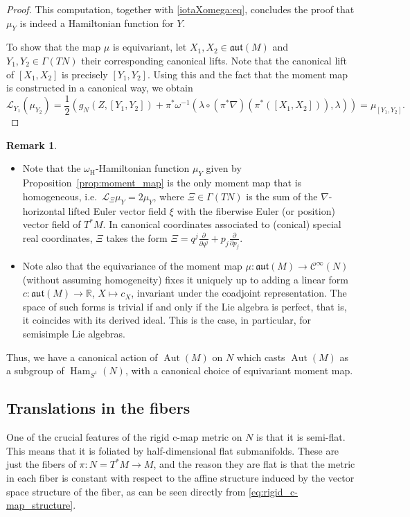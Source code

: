 \documentclass{article}
\theoremstyle{definition}
\newtheorem{remark}[theorem]{Remark}
\DeclareMathOperator{\Aut}{Aut}
\DeclareMathOperator{\Ham}{Ham}
\newcommand{\R}{\mathbb{R}}
\newcommand{\calC}{\mathcal{C}}
\newcommand{\calL}{\mathcal{L}}
\newcommand{\hor}{\mathrm{H}}
\newcommand{\aut}{\mathfrak{aut}}
\newcommand{\pd}[2]{\frac{\partial #1}{\partial #2}}
\begin{document}
\begin{proof}
        This computation, together with \eqref{iotaXomega:eq}, concludes the proof that $\mu_Y$ is indeed a Hamiltonian function for $Y$.\medskip
		
		To show that the map $\mu$ is equivariant, let $X_1,X_2\in\aut(M)$ and $Y_1,Y_2\in\Gamma(TN)$ their corresponding canonical lifts. Note that the canonical lift of $[X_1,X_2]$ is precisely $[Y_1,Y_2]$. Using this and the fact that the moment map is constructed in a canonical way, we obtain $$\calL_{Y_1}(\mu_{Y_2})=\frac{1}{2}\left(g_N(Z,[Y_1,Y_2])+\pi^*\omega^{-1}(\lambda\circ(\pi^*\nabla)(\pi^*([X_1,X_2])),\lambda)\right)=\mu_{[Y_1,Y_2]}.$$
	\end{proof}

	\begin{remark}\textcolor{white}{}
		\begin{itemize}
			\itemsep 0em
			\item Note that the $\omega_\hor$-Hamiltonian function $\mu_Y$ given by Proposition~\ref{prop:moment_map} is the only moment map that is homogeneous, i.e.\ $\calL_\Xi\mu_Y=2\mu_Y$, where $\Xi\in\Gamma(TN)$ is the sum of the $\nabla$-horizontal lifted Euler vector field $\xi$ with the fiberwise Euler (or position) vector field of $T^*M$. In canonical coordinates associated to (conical) special real coordinates, $\Xi$ takes the form $\Xi=q^j\pd{}{q^j}+p_j\pd{}{p_j}$.
			\item Note also that the equivariance of the moment map $\mu:\mathfrak{aut}(M)\longrightarrow\calC^\infty(N)$ (without assuming homogeneity) fixes it uniquely up to adding a linear form $c:\mathfrak{aut}(M)\longrightarrow\R$, $X\longmapsto c_X$, invariant under the coadjoint representation. The space of such forms is trivial if and only if the Lie algebra is perfect, that is, it coincides with its derived ideal. This is the case, in particular, for semisimple Lie algebras.
		\end{itemize}
	\end{remark}

	Thus, we have a canonical action of $\Aut(M)$ on $N$ which casts $\Aut(M)$ as a subgroup of $\Ham_{S^1}(N)$, with a canonical choice of equivariant moment map.
	
	\subsection{Translations in the fibers}
	
	One of the crucial features of the rigid c-map metric on $N$ is that it is semi-flat. This means that it is foliated by half-dimensional flat submanifolds. These are just the fibers of $\pi:N=T^*M\longrightarrow M$, and the reason they are flat is that the metric in each fiber is constant with respect to the affine structure induced by the vector space structure of the fiber, as can be seen directly from \eqref{eq:rigid_c-map_structure}.\medskip
	
\end{document}
